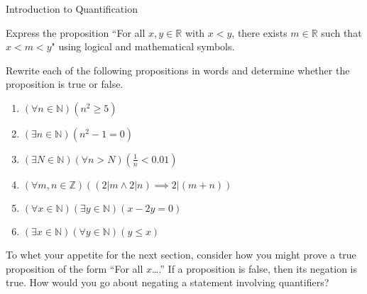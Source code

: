 \begin{section}{Introduction to Quantification}
\begin{problem}
Express the proposition ``For all $x,y\in\mathbb{R}$ with $x<y$, there exists $m\in\mathbb{R}$ such that $x<m<y$" using logical and mathematical symbols.
\end{problem}

\begin{problem}
Rewrite each of the following propositions in words and determine whether the proposition is true or false.
\begin{enumerate}[label=\textrm{(\alph*)}]
\item $(\forall n \in \mathbb{N})(n^2 \geq 5)$
\item $(\exists n \in \mathbb{N})(n^2-1=0)$
\item $(\exists N \in \mathbb{N})(\forall  n > N)(\frac{1}{n} < 0.01)$
\item $(\forall m, n \in \mathbb{Z})((2|m \wedge 2|n) \implies 2|(m+n))$
\item $(\forall x \in \mathbb{N})(\exists y \in \mathbb{N})(x-2y=0)$
\item $(\exists x \in \mathbb{N})(\forall y \in \mathbb{N})(y \leq x)$
\end{enumerate}
\end{problem}

To whet your appetite for the next section, consider how you might prove a true proposition of the form ``For all $x$\ldots.'' If a proposition is false, then its negation is true. How would you go about negating a statement involving quantifiers? 

\end{section}